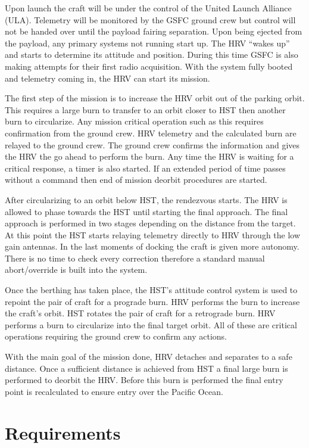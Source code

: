 \documentclass[onecolumn,10pt]{jhwhw}
\begin{document}
Upon launch the craft will be under the control of the United Launch Alliance (ULA). Telemetry will be monitored by the GSFC ground crew but control will not be handed over until the payload fairing separation. Upon being ejected from the payload, any primary systems not running start up. The HRV “wakes up” and starts to determine its attitude and position. During this time GSFC is also making attempts for their first radio acquisition. With the system fully booted and telemetry coming in, the HRV can start its mission.

The first step of the mission is to increase the HRV orbit out of the parking orbit. This requires a large burn to transfer to an orbit closer to HST then another burn to circularize. Any mission critical operation such as this requires confirmation from the ground crew. HRV telemetry and the calculated burn are relayed to the ground crew. The ground crew confirms the information and gives the HRV the go ahead to perform the burn. Any time the HRV is waiting for a critical response, a timer is also started. If an extended period of time passes without a command then end of mission deorbit procedures are started.

After circularizing to an orbit below HST, the rendezvous starts. The HRV is allowed to phase towards the HST until starting the final approach. The final approach is performed in two stages depending on the distance from the target. At this point the HST starts relaying telemetry directly to HRV through the low gain antennas. In the last moments of docking the craft is given more autonomy. There is no time to check every correction therefore a standard manual abort/override is built into the system.

Once the berthing has taken place, the HST's attitude control system is used to repoint the pair of craft for a prograde burn. HRV performs the burn to increase the craft's orbit. HST rotates the pair of craft for a retrograde burn. HRV performs a burn to circularize into the final target orbit. All of these are critical operations requiring the ground crew to confirm any actions.

With the main goal of the mission done, HRV detaches and separates to a safe distance. Once a sufficient distance is achieved from HST a final large burn is performed to deorbit the HRV. Before this burn is performed the final entry point is recalculated to ensure entry over the Pacific Ocean.

\chapter{Requirements}
\end{document}
